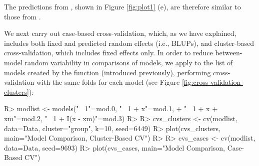 \documentclass[
]{jss}
\begin{document}
The predictions from , shown in Figure \ref{fig:plot1} (e),
are therefore similar to those from .

We next carry out case-based cross-validation, which, as we have
explained, includes both fixed and predicted random effects (i.e.,
BLUPs), and cluster-based cross-validation, which includes fixed effects
only. In order to reduce between-model random variability in comparisons
of models, we apply  to the list of models created by the
 function (introduced previously), performing
cross-validation with the same folds for each model (see Figure
\ref{fig:cross-validation-clusters}):

\begin{CodeChunk}
\begin{CodeInput}
R> modlist <- models("~ 1"=mod.0, "~ 1 + x"=mod.1, 
+                   "~ 1 + x + xm"=mod.2, "~ 1 + I(x - xm)"=mod.3)
R> 
R> cvs_clusters <- cv(modlist, data=Data, cluster="group", k=10, seed=6449)
R> plot(cvs_clusters, main="Model Comparison, Cluster-Based CV")
R> 
R> cvs_cases <- cv(modlist, data=Data, seed=9693)
R> plot(cvs_cases, main="Model Comparison, Case-Based CV")
\end{CodeInput}
\begin{figure}

{\centering {}

}
\end{figure}
\end{CodeChunk}
\end{document}
